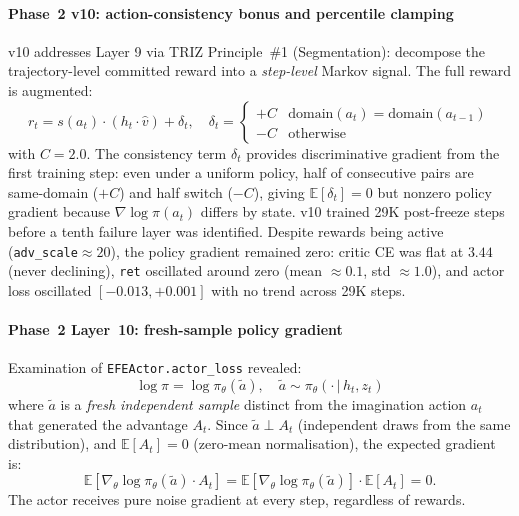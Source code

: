 \documentclass[journal,onecolumn,11pt]{IEEEtran}
\begin{document}
\paragraph{Phase~2 v10: action-consistency bonus and percentile clamping}
v10 addresses Layer 9 via TRIZ Principle~\#1 (Segmentation): decompose the
trajectory-level committed reward into a \emph{step-level} Markov signal.
The full reward is augmented:
\begin{equation}
  r_t = s(a_t)\cdot(h_t\cdot\hat{v}) + \delta_t, \quad
  \delta_t = \begin{cases} +C & \text{domain}(a_t)=\text{domain}(a_{t-1}) \\ -C & \text{otherwise} \end{cases}
  \label{eq:consistency_bonus}
\end{equation}
with $C{=}2.0$.
The consistency term $\delta_t$ provides discriminative gradient from the first training step:
even under a uniform policy, half of consecutive pairs are same-domain ($+C$) and half switch ($-C$),
giving $\mathbb{E}[\delta_t]=0$ but nonzero policy gradient because
$\nabla\log\pi(a_t)$ differs by state.
v10 trained 29K post-freeze steps before a tenth failure layer was identified.
Despite rewards being active (\texttt{adv\_scale}$\approx 20$), the policy gradient remained zero:
critic CE was flat at $3.44$ (never declining), \texttt{ret} oscillated around zero (mean $\approx 0.1$,
std $\approx 1.0$), and actor loss oscillated $[-0.013, +0.001]$ with no trend across 29K steps.

\paragraph{Phase~2 Layer~10: fresh-sample policy gradient}
Examination of \texttt{EFEActor.actor\_loss} revealed:
\begin{equation}
  \log\pi = \log\pi_\theta(\tilde{a}),\quad \tilde{a} \sim \pi_\theta(\cdot\,|\,h_t, z_t)
\end{equation}
where $\tilde{a}$ is a \emph{fresh independent sample} distinct from the imagination action
$a_t$ that generated the advantage $A_t$.
Since $\tilde{a} \perp A_t$ (independent draws from the same distribution), and $\mathbb{E}[A_t]=0$
(zero-mean normalisation), the expected gradient is:
\begin{equation}
  \mathbb{E}\!\left[\nabla_\theta\log\pi_\theta(\tilde{a})\cdot A_t\right]
  = \mathbb{E}\!\left[\nabla_\theta\log\pi_\theta(\tilde{a})\right]\cdot\mathbb{E}[A_t] = 0.
\end{equation}
The actor receives pure noise gradient at every step, regardless of rewards.
\end{document}
